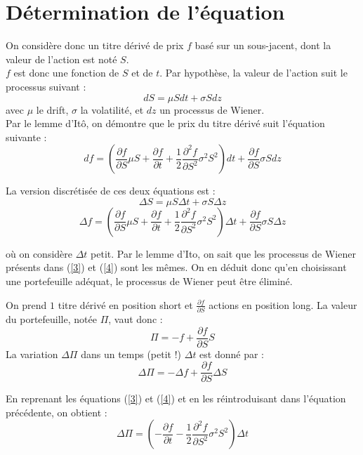 \section{Détermination de l'équation}
On considère donc un titre dérivé de prix $f$ basé sur un sous-jacent, dont la valeur de l'action est noté $S$. \\
$f$ est donc une fonction de $S$ et de $t$. Par hypothèse, la valeur de l'action suit le processus suivant :
	\begin{equation}\label{1} dS=\mu Sdt + \sigma S dz\end{equation}
avec $\mu$ le drift, $\sigma$ la volatilité, et $dz$ un processus de Wiener. \\
Par le lemme d'Itô, on démontre que le prix du titre dérivé suit l'équation suivante : 
\begin{equation} \label{2} df=\left(\frac{\partial f}{\partial S} \mu S + \frac{\partial f}{\partial t} + \frac{1}{2}\frac{\partial^2 f}{\partial S^2} \sigma^2S^2\right)dt + \frac{\partial f}{\partial S} \sigma S dz\end{equation}

La version discrétisée de ces deux équations est : 
	\begin{equation}\label{3} \Delta S=\mu S \Delta t + \sigma S \Delta z\end{equation}
\begin{equation} \label{4} \Delta f=\left(\frac{\partial f}{\partial S} \mu S + \frac{\partial f}{\partial t} + \frac{1}{2}\frac{\partial^2 f}{\partial S^2} \sigma^2S^2\right)\Delta t + \frac{\partial f}{\partial S} \sigma S \Delta z\end{equation}

où on considère $\Delta t$ petit. Par le lemme d'Ito, on sait que les processus de Wiener présents dans (\ref{3}) et (\ref{4}) sont les mêmes. On en déduit donc qu'en choisissant une portefeuille adéquat, le processus de Wiener peut être éliminé. 

\bigskip
On prend $1$ titre dérivé en position short et $\frac{\partial f}{\partial S}$ actions en position long. La valeur du portefeuille, notée $\Pi$, vaut donc : 
\[\Pi=-f+\frac{\partial f}{\partial S} S\]
La variation $\Delta \Pi$ dans un temps (petit !) $\Delta t$ est donné par : 
\[\Delta\Pi = -\Delta f+\frac{\partial f}{\partial S} \Delta S\]

En reprenant les équations (\ref{3}) et (\ref{4}) et en les réintroduisant dans l'équation précédente, on obtient : 
\begin{equation} \label{5} \Delta\Pi = \left( -\frac{\partial f}{\partial t} - \frac{1}{2} \frac{\partial^2 f}{\partial S^2}\sigma^2S^2 \right) \Delta t\end{equation}

